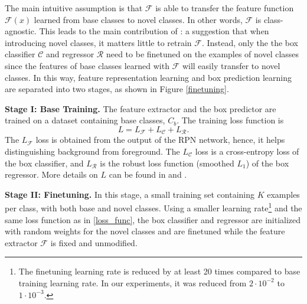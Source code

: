 \documentclass{article}
\begin{document}
The main intuitive assumption is that $\mathcal{F}$ is able to transfer the feature function 
$\mathcal{F}(x)$ learned from base classes to 
novel classes. In other words, $\mathcal{F}$ is class-agnostic. This leads to the main contribution of 
\cite{wang2020frustratingly}: a suggestion that when introducing novel classes, it matters 
little to retrain $\mathcal{F}$. Instead, only the the box classifier $\mathcal{C}$ and regressor $\mathcal{R}$
need to be finetuned on the examples of novel classes since the features of base classes learned with $\mathcal{F}$ 
will easily transfer to novel classes. In this way, feature representation learning and box 
prediction learning are separated into two stages, as shown in Figure \ref{finetuning}.

\textbf{Stage I: Base Training. } 
The feature  extractor and the box predictor are trained on a dataset containing 
base classes, $C_b$. The training loss function \cite{ren2015faster} is 
\begin{equation}
  L = L_{\mathcal{F}} + L_{\mathcal{C}} + L_{\mathcal{R}}. 
  \label{loss_func}
\end{equation}
The $L_{\mathcal{F}}$ loss is obtained from the output of the RPN network, hence, it helps distinguishing 
background from foreground. The $L_{\mathcal{C}}$ loss is a cross-entropy loss of the box classifier, and 
$L_{\mathcal{R}}$ is the robust loss function (smoothed $L_1$) of the box regressor. More details on $L$ can be
found in \cite{ren2015faster} and \cite{girshick2015fast}. 

\textbf{Stage II: Finetuning. }
In this stage, a small training set containing $K$ examples per class, with both base and novel classes. 
Using a smaller learning rate\footnote{The finetuning learning rate is reduced by at least 20 times compared 
to base training learning rate. In our experiments, it was reduced from $2\cdot10^{-2}$ to $1\cdot10^{-3}$.} 
and the same loss function as in \eqref{loss_func}, the box classifier 
and regressor are initialized with random weights for the novel classes and are finetuned 
while the feature extractor $\mathcal{F}$ is fixed and unmodified. 
\end{document}
